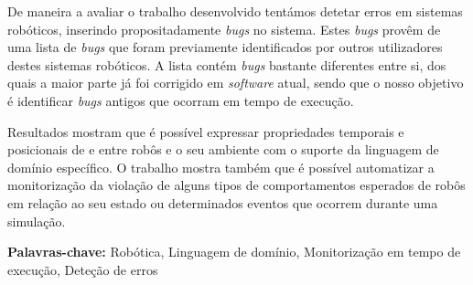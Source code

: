 De maneira a avaliar o trabalho desenvolvido tentámos detetar erros em sistemas robóticos, inserindo propositadamente \textit{bugs} no sistema. Estes \textit{bugs} provêm de uma lista de \textit{bugs} que foram previamente identificados por outros utilizadores destes sistemas robóticos. A lista contém \textit{bugs} bastante diferentes entre si, dos quais a maior parte já foi corrigido em \textit{software} atual, sendo que o nosso objetivo é identificar \textit{bugs} antigos que ocorram em tempo de execução.

Resultados mostram que é possível expressar propriedades temporais e posicionais de e entre robôs e o seu ambiente com o suporte da linguagem de domínio específico. O trabalho mostra também que é possível automatizar a monitorização da violação de alguns tipos de comportamentos esperados de robôs em relação ao seu estado ou determinados eventos que ocorrem durante uma simulação.



\vfill

\begin{flushleft}
\textbf{Palavras-chave:}
Robótica, Linguagem de domínio, Monitorização em tempo de execução, Deteção de erros
\end{flushleft}

